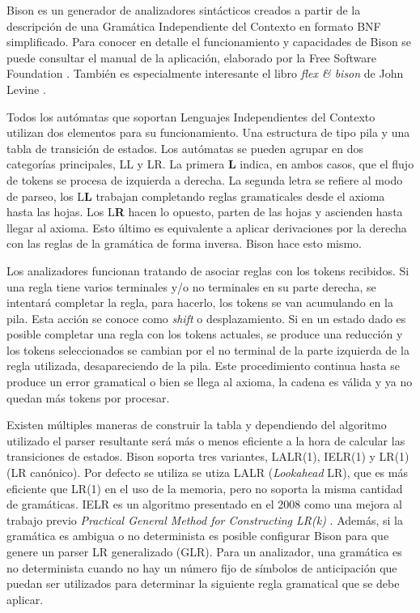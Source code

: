Bison es un generador de analizadores sintácticos creados a partir de la descripción de una Gramática Independiente del Contexto en formato BNF simplificado. Para conocer en detalle el funcionamiento y capacidades de Bison se puede consultar el manual de la aplicación, elaborado por la Free Software Foundation
\cite{fsf_web_bisonManual}. También es especialmente interesante el libro \emph{flex \& bison} de John Levine \cite{levine_book_flexBison}.

\label{automatas-pila} Todos los autómatas que soportan Lenguajes Independientes del Contexto utilizan dos elementos para su funcionamiento. Una estructura de tipo pila y una tabla de transición de estados. Los autómatas se pueden agrupar en dos categorías principales, LL y LR. La primera \textbf{L} indica, en ambos casos, que el flujo de tokens se procesa de izquierda a derecha. La segunda letra se refiere al modo de parseo, los L\textbf{L} trabajan completando reglas gramaticales desde el axioma hasta las hojas. Los L\textbf{R} hacen lo opuesto, parten de las hojas y ascienden hasta llegar al axioma. Esto último es equivalente a aplicar derivaciones por la derecha con las reglas de la gramática de forma inversa. Bison hace esto mismo.

Los analizadores funcionan tratando de asociar reglas con los tokens recibidos. Si una regla tiene varios terminales y/o no terminales en su parte derecha, se intentará completar la regla, para hacerlo, los tokens se van acumulando en la pila. Esta acción se conoce como \emph{shift} o desplazamiento. Si en un estado dado es posible completar una regla con los tokens actuales, se produce una reducción y los tokens seleccionados se cambian por el no terminal de la parte izquierda de la regla utilizada, desapareciendo de la pila. Este procedimiento continua hasta se produce un error gramatical o bien se llega al axioma, la cadena es válida y ya no quedan más tokens por procesar.

Existen múltiples maneras de construir la tabla y dependiendo del algoritmo utilizado el parser resultante será más o menos eficiente a la hora de calcular las transiciones de estados. Bison soporta tres variantes, LALR(1), IELR(1) y LR(1) (LR canónico). Por defecto se utiliza se utiza LALR (\emph{Lookahead} LR), que es más eficiente que LR(1) en el uso de la memoria, pero no soporta la misma cantidad de gramáticas. IELR es un algoritmo presentado en el 2008 \cite{dennyMalloy_paper_IELRAlgorithm} como una mejora al trabajo previo \emph{Practical General Method for Constructing LR(k)} \cite{pager_paper_constructLRparsers}. Además, si la gramática es ambigua o no determinista es posible configurar Bison para que genere un parser LR generalizado (GLR). Para un analizador, una gramática es no determinista cuando no hay un número fijo de símbolos de anticipación que puedan ser utilizados para determinar la siguiente regla gramatical que se debe aplicar.


